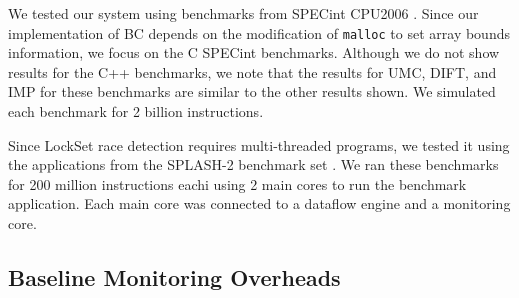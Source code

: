 We tested our system using benchmarks from SPECint
CPU2006 \cite{spec2006}. Since our implementation of BC depends on the
modification of {\tt malloc} to set array bounds information, we focus on the C
SPECint benchmarks. Although we do not
show results for the C++ benchmarks, we note that the results for UMC, DIFT, and IMP
for these benchmarks are similar to the other results shown.
We simulated each benchmark for 2 billion instructions. 

Since LockSet race detection requires multi-threaded programs, we tested it using
the applications from the SPLASH-2 benchmark set \cite{splash-isca95}. We ran these benchmarks for
200 million instructions eachi using 2 main cores to run the benchmark application.
Each main core was connected to a dataflow engine and a monitoring core.

\subsection{Baseline Monitoring Overheads}



